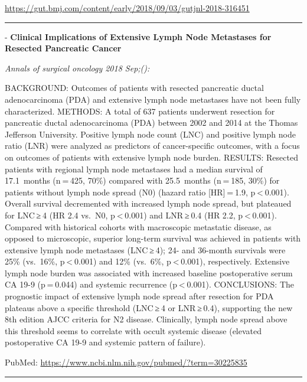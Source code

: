 \documentclass[]{article}
\begin{document}
\url{https://gut.bmj.com/content/early/2018/09/03/gutjnl-2018-316451}

\begin{center}\rule{0.5\linewidth}{\linethickness}\end{center}

 - \textbf{Clinical Implications of Extensive Lymph Node Metastases for
Resected Pancreatic Cancer}

\emph{Annals of surgical oncology 2018 Sep;():}

BACKGROUND: Outcomes of patients with resected pancreatic ductal
adenocarcinoma (PDA) and extensive lymph node metastases have not been
fully characterized. METHODS: A total of 637 patients underwent
resection for pancreatic ductal adenocarcinoma (PDA) between 2002 and
2014 at the Thomas Jefferson University. Positive lymph node count (LNC)
and positive lymph node ratio (LNR) were analyzed as predictors of
cancer-specific outcomes, with a focus on outcomes of patients with
extensive lymph node burden. RESULTS: Resected patients with regional
lymph node metastases had a median survival of 17.1~months (n = 425,
70\%) compared with 25.5~months (n = 185, 30\%) for patients without
lymph node spread (N0) (hazard ratio {[}HR{]} = 1.9,
p \textless{} 0.001). Overall survival decremented with increased lymph
node spread, but plateaued for LNC ≥ 4 (HR 2.4 vs.~N0,
p \textless{} 0.001) and LNR ≥ 0.4 (HR 2.2, p \textless{} 0.001).
Compared with historical cohorts with macroscopic metastatic disease, as
opposed to microscopic, superior long-term survival was achieved in
patients with extensive lymph node metastases (LNC ≥ 4); 24- and
36-month survivals were 25\% (vs.~16\%, p \textless{} 0.001) and 12\%
(vs.~6\%, p \textless{} 0.001), respectively. Extensive lymph node
burden was associated with increased baseline postoperative serum CA
19-9 (p = 0.044) and systemic recurrence (p \textless{} 0.001).
CONCLUSIONS: The prognostic impact of extensive lymph node spread after
resection for PDA plateaus above a specific threshold (LNC ≥ 4 or
LNR ≥ 0.4), supporting the new 8th edition AJCC criteria for N2 disease.
Clinically, lymph node spread above this threshold seems to correlate
with occult systemic disease (elevated postoperative CA 19-9 and
systemic pattern of failure).

PubMed: \url{https://www.ncbi.nlm.nih.gov/pubmed/?term=30225835}

{}

{}

\begin{center}\rule{0.5\linewidth}{\linethickness}\end{center}
\end{document}
